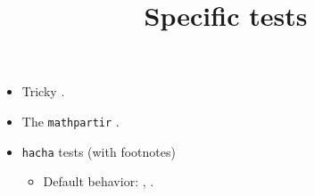 \documentclass{article}
\title{Specific tests}
\author{}
\date{}
\begin{document}
\maketitle
\begin{itemize}
\item Tricky .
\item The \texttt{mathpartir} .
\item \texttt{hacha} tests (with footnotes)
\begin{itemize}
\item Default behavior: ,
.
\end{itemize}
\end{itemize}
\end{document}
